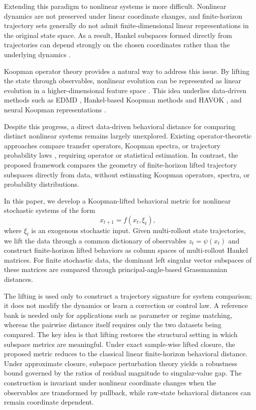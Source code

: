 \documentclass[letterpaper, 10 pt, conference]{ieeeconf}  %
\begin{document}
Extending this paradigm to nonlinear systems is more difficult. Nonlinear dynamics are not preserved under linear coordinate changes, and finite-horizon trajectory sets generally do not admit finite-dimensional linear representations in the original state space. As a result, Hankel subspaces formed directly from trajectories can depend strongly on the chosen coordinates rather than the underlying dynamics \cite{padoan2025distances}.

Koopman operator theory provides a natural way to address this issue. By lifting the state through observables, nonlinear evolution can be represented as linear evolution in a higher-dimensional feature space \cite{koopman1931hamiltonian,mezic2005spectral,mezic2013analysis,huang2018feedback,vaidya2025koopman}. This idea underlies data-driven methods such as EDMD \cite{williams2015data}, Hankel-based Koopman methods and HAVOK \cite{brunton2017havok}, and neural Koopman representations \cite{lusch2018deep}.


Despite this progress, a direct data-driven behavioral distance for
comparing distinct nonlinear systems remains largely unexplored.
Existing operator-theoretic approaches compare transfer operators,
Koopman spectra, or trajectory probability laws
\cite{mehta2005stochastic,mezic2004comparison,yu2009kullback},
requiring operator or statistical estimation.
In contrast, the proposed framework compares the geometry of
finite-horizon lifted trajectory subspaces directly from data,
without estimating Koopman operators, spectra, or probability
distributions.

In this paper, we develop a Koopman-lifted behavioral metric for nonlinear stochastic systems of the form
\[
  x_{t+1}=f(x_t,\xi_t),
\]
where $\xi_t$ is an exogenous stochastic input. Given multi-rollout state trajectories, we lift the data through a common dictionary of observables $z_t=\psi(x_t)$ and construct finite-horizon lifted behaviors as column spaces of multi-rollout Hankel matrices. For finite stochastic data, the dominant left singular vector subspaces of these matrices are compared through principal-angle-based Grassmannian distances.

The lifting is used only to construct a trajectory signature for system comparison; it does not modify the dynamics or learn a correction or control law. A reference bank is needed only for applications such as parameter or regime matching, whereas the pairwise distance itself requires only the two datasets being compared.
The key idea is that lifting restores the structural setting in which subspace metrics are meaningful. Under exact sample-wise lifted closure, the proposed metric reduces to the classical linear finite-horizon behavioral distance. Under approximate closure, subspace perturbation theory \cite{davis1970rotation,wedin1972perturbation} yields a robustness bound governed by the ratios of residual magnitude to singular-value gap. The construction is invariant under nonlinear coordinate changes when the observables are transformed by pullback, while raw-state behavioral distances can remain coordinate dependent.
\end{document}
